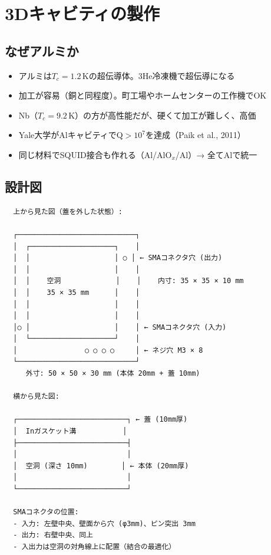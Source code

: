 \documentclass[12pt,a4paper]{article}
\begin{document}
\section{3Dキャビティの製作}

\subsection{なぜアルミか}

\begin{theorybox}[材料選択の理由]
\begin{itemize}
\item アルミは$T_c = 1.2\,\mathrm{K}$の超伝導体。3He冷凍機で超伝導になる
\item 加工が容易（銅と同程度）。町工場やホームセンターの工作機でOK
\item Nb（$T_c = 9.2\,\mathrm{K}$）の方が高性能だが、硬くて加工が難しく、高価
\item Yale大学がAlキャビティでQ$> 10^7$を達成（Paik et al., 2011）
\item 同じ材料でSQUID接合も作れる（Al/AlO$_x$/Al）→ 全てAlで統一
\end{itemize}
\end{theorybox}

\subsection{設計図}

\begin{verbatim}
  上から見た図（蓋を外した状態）:

  ┌────────────────────────────┐
  │  ┌────────────────────┐    │
  │  │                    │ ○ │ ← SMAコネクタ穴 (出力)
  │  │                    │    │
  │  │    空洞             │    │    内寸: 35 × 35 × 10 mm
  │  │    35 × 35 mm      │    │
  │  │                    │    │
  │  │                    │    │
  │○ │                    │    │ ← SMAコネクタ穴 (入力)
  │  └────────────────────┘    │
  │                ○ ○ ○ ○     │ ← ネジ穴 M3 × 8
  └────────────────────────────┘
     外寸: 50 × 50 × 30 mm (本体 20mm + 蓋 10mm)

  横から見た図:

  ┌──────────────────────────┐ ← 蓋 (10mm厚)
  │  Inガスケット溝           │
  ├──────────────────────────┤
  │                          │
  │  空洞 (深さ 10mm)        │ ← 本体 (20mm厚)
  │                          │
  └──────────────────────────┘

  SMAコネクタの位置:
  - 入力: 左壁中央、壁面から穴 (φ3mm)、ピン突出 3mm
  - 出力: 右壁中央、同上
  - 入出力は空洞の対角線上に配置（結合の最適化）
\end{verbatim}
\end{document}
